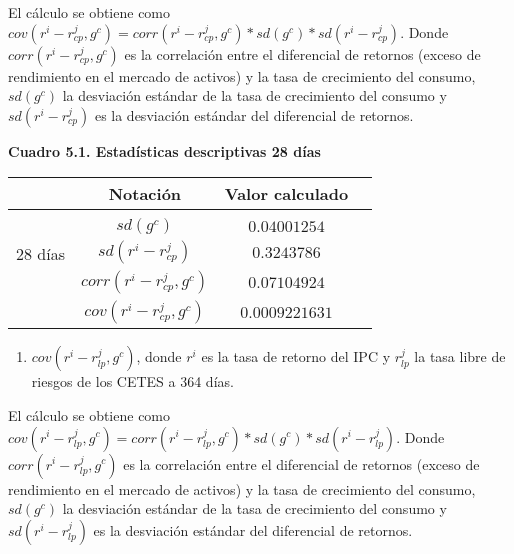 \documentclass[
]{article}
\providecommand{\tightlist}{%
  \setlength{\itemsep}{0pt}\setlength{\parskip}{0pt}}
\begin{document}
El cálculo se obtiene como
\(cov(r^i-r_{cp}^j, g^c)=corr(r^i-r_{cp}^j, g^c)*sd(g^c)*sd(r^i-r_{cp}^j)\).
Donde \(corr(r^i-r_{cp}^j, g^c)\) es la correlación entre el diferencial
de retornos (exceso de rendimiento en el mercado de activos) y la tasa
de crecimiento del consumo, \(sd(g^c)\) la desviación estándar de la
tasa de crecimiento del consumo y \(sd(r^i-r_{cp}^j)\) es la desviación
estándar del diferencial de retornos.

\begin{center}
\textbf{Cuadro 5.1. Estadísticas descriptivas 28 días}
\end{center}

\begin{table}[h!]
                \begin{center} 
                    \begin{tabular}{|c|c|c|c|} 
                        \hline 
                        \mbox{}\;\;\;\;\;\mbox{}& \; Notación\;  & \; Valor calculado\; \\ 
                        \hline 
                        \multirow{4}{*}{\begin{sideways}28 días\end{sideways}}
                        &  &   \\
                        & $sd(g^c)$  & $0.04001254$  \\ 
                        &$sd(r^i-r_{cp}^j)$ & $0.3243786$ \\ 
                        &$corr(r^i-r_{cp}^j, g^c)$ & $0.07104924$ \\ 
                        &$cov(r^i-r_{cp}^j, g^c)$  & $0.0009221631$ \\                      
                        \hline \hline
                        \hline
                    \end{tabular}
                \end{center}
\end{table}

\begin{enumerate}
\def\labelenumi{\roman{enumi})}
\setcounter{enumi}{1}
\tightlist
\item
  \(cov(r^i-r_{lp}^j, g^c)\), donde \(r^i\) es la tasa de retorno del
  IPC y \(r_{lp}^j\) la tasa libre de riesgos de los CETES a 364 días.
\end{enumerate}

El cálculo se obtiene como
\(cov(r^i-r_{lp}^j, g^c)=corr(r^i-r_{lp}^j, g^c)*sd(g^c)*sd(r^i-r_{lp}^j)\).
Donde \(corr(r^i-r_{lp}^j, g^c)\) es la correlación entre el diferencial
de retornos (exceso de rendimiento en el mercado de activos) y la tasa
de crecimiento del consumo, \(sd(g^c)\) la desviación estándar de la
tasa de crecimiento del consumo y \(sd(r^i-r_{lp}^j)\) es la desviación
estándar del diferencial de retornos.
\end{document}
